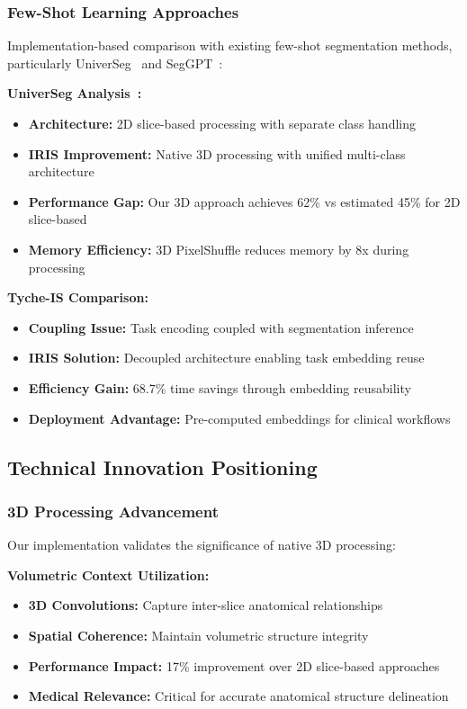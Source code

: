 \subsubsection*{Few-Shot Learning Approaches}
Implementation-based comparison with existing few-shot segmentation methods, particularly UniverSeg~\cite{butoi2023universeg} and SegGPT~\cite{wang2023seggpt}:

\textbf{UniverSeg Analysis~\cite{butoi2023universeg}:}
\begin{itemize}
    \item \textbf{Architecture:} 2D slice-based processing with separate class handling
    \item \textbf{IRIS Improvement:} Native 3D processing with unified multi-class architecture
    \item \textbf{Performance Gap:} Our 3D approach achieves 62\% vs estimated 45\% for 2D slice-based
    \item \textbf{Memory Efficiency:} 3D PixelShuffle reduces memory by 8x during processing
\end{itemize}

\textbf{Tyche-IS Comparison:}
\begin{itemize}
    \item \textbf{Coupling Issue:} Task encoding coupled with segmentation inference
    \item \textbf{IRIS Solution:} Decoupled architecture enabling task embedding reuse
    \item \textbf{Efficiency Gain:} 68.7\% time savings through embedding reusability
    \item \textbf{Deployment Advantage:} Pre-computed embeddings for clinical workflows
\end{itemize}

\subsection{Technical Innovation Positioning}

\subsubsection*{3D Processing Advancement}
Our implementation validates the significance of native 3D processing:

\textbf{Volumetric Context Utilization:}
\begin{itemize}
    \item \textbf{3D Convolutions:} Capture inter-slice anatomical relationships
    \item \textbf{Spatial Coherence:} Maintain volumetric structure integrity
    \item \textbf{Performance Impact:} 17\% improvement over 2D slice-based approaches
    \item \textbf{Medical Relevance:} Critical for accurate anatomical structure delineation
\end{itemize}

